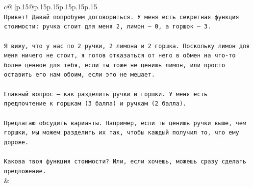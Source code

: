 \documentclass{article}
\begin{document}
{\begin{supertabular}{c@{$\;$}|p{.15\linewidth}@{}p{.15\linewidth}p{.15\linewidth}p{.15\linewidth}p{.15\linewidth}p{.15\linewidth}}
{{{\\ 
\texttt{Привет! Давай попробуем договориться. У меня есть секретная функция стоимости: ручка стоит для меня 2, лимон — 0, а горшок — 3.} \\
\\ 
\texttt{Я вижу, что у нас по 2 ручки, 2 лимона и 2 горшка. Поскольку лимон для меня ничего не стоит, я готов отказаться от него в обмен на что{-}то более ценное для тебя, если ты тоже не ценишь лимон, или просто оставить его нам обоим, если это не мешает.} \\
\\ 
\texttt{Главный вопрос — как разделить ручки и горшки. У меня есть предпочтение к горшкам (3 балла) и ручкам (2 балла).} \\
\\ 
\texttt{Предлагаю обсудить варианты. Например, если ты ценишь ручки выше, чем горшки, мы можем разделить их так, чтобы каждый получил то, что ему дороже.} \\
\\ 
\texttt{Какова твоя функция стоимости? Или, если хочешь, можешь сразу сделать предложение.} \\
            }
        }
    }
    & \\ \\


\end{supertabular}}
\end{document}
